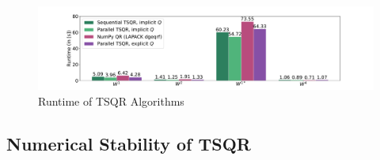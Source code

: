 \documentclass{article}
\begin{document}
\begin{figure}[t]
    \centering
    \caption{Runtime of TSQR Algorithms} \label{fig:performanceTSQR}
    \includegraphics[width=\textwidth, trim = 0cm 1.5cm 0cm 1cm]{./plots/TSQR_Performance.pdf}
\end{figure}

\subsection{Numerical Stability of TSQR}
\end{document}
